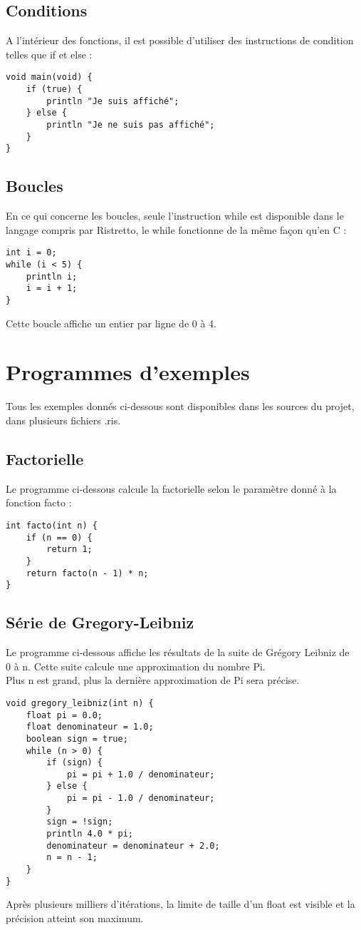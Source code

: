\documentclass[12pt]{report}
\begin{document}
\subsection{Conditions}
A l'intérieur des fonctions, il est possible d'utiliser des instructions de condition telles que if et else :
\begin{verbatim}
void main(void) {
    if (true) {
        println "Je suis affiché";
    } else {
        println "Je ne suis pas affiché";
    }
}
\end{verbatim}
\subsection{Boucles}
En ce qui concerne les boucles, seule l'instruction while est disponible dans le langage compris par Ristretto, le while fonctionne de la même façon qu'en C :
\begin{verbatim}
int i = 0;
while (i < 5) {
    println i;
    i = i + 1;
}
\end{verbatim}
Cette boucle affiche un entier par ligne de 0 à 4.
\newpage
{}
\section{Programmes d'exemples}
Tous les exemples donnés ci-dessous sont disponibles dans les sources du projet, dans plusieurs fichiers .ris.
\subsection{Factorielle}
Le programme ci-dessous calcule la factorielle selon le paramètre donné à la fonction facto :
\begin{verbatim}
int facto(int n) {
    if (n == 0) {
	    return 1;
    }
    return facto(n - 1) * n;
}
\end{verbatim}
\subsection{Série de Gregory-Leibniz}
Le programme ci-dessous affiche les résultats de la suite de Grégory Leibniz de\\0 à n. Cette suite calcule une approximation du nombre Pi.\\
Plus n est grand, plus la dernière approximation de Pi sera précise.
\begin{verbatim}
void gregory_leibniz(int n) {
    float pi = 0.0;
    float denominateur = 1.0;
    boolean sign = true;
    while (n > 0) {
        if (sign) {
            pi = pi + 1.0 / denominateur;
        } else {
            pi = pi - 1.0 / denominateur;
        }
        sign = !sign;
        println 4.0 * pi;
        denominateur = denominateur + 2.0;
        n = n - 1;
    }
}
\end{verbatim}
Après plusieurs milliers d'itérations, la limite de taille d'un float est visible et la précision atteint son maximum.
\newpage
{}
\end{document}
